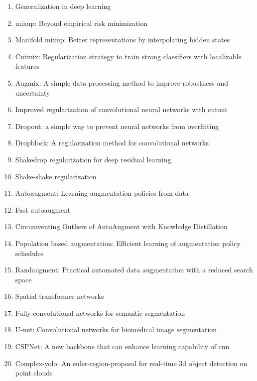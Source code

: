 \documentclass[acmlarge]{acmart}
\begin{document}
\begin{enumerate}
	\item Generalization in deep learning \cite{kawaguchi2017generalization}
	\item mixup: Beyond empirical risk minimization \cite{zhang2017mixup}
	\item Manifold mixup: Better representations by interpolating hidden states \cite{verma2019manifold}
	\item Cutmix: Regularization strategy to train strong classifiers with localizable features \cite{yun2019cutmix}
	\item Augmix: A simple data processing method to improve robustness and uncertainty \cite{hendrycks2019augmix}
	\item Improved regularization of convolutional neural networks with cutout \cite{devries2017improved}
	\item Dropout: a simple way to prevent neural networks from overfitting \cite{srivastava2014dropout}
	\item Dropblock: A regularization method for convolutional networks \cite{ghiasi2018dropblock}
	\item Shakedrop regularization for deep residual learning \cite{yamada2019shakedrop}
	\item Shake-shake regularization \cite{gastaldi2017shake}
	\item Autoaugment: Learning augmentation policies from data \cite{cubuk2018autoaugment}
	\item Fast autoaugment \cite{lim2019fast}
	\item Circumventing Outliers of AutoAugment with Knowledge Distillation \cite{wei2020circumventing}
	\item Population based augmentation: Efficient learning of augmentation policy schedules \cite{ho2019population}
	\item Randaugment: Practical automated data augmentation with a reduced search space \cite{cubuk2020randaugment}
	\item Spatial transformer networks \cite{jaderberg2015spatial}
	\item Fully convolutional networks for semantic segmentation \cite{long2015fully}
	\item U-net: Convolutional networks for biomedical image segmentation \cite{ronneberger2015u}
	\item CSPNet: A new backbone that can enhance learning capability of cnn \cite{wang2020cspnet}
	\item Complex-yolo: An euler-region-proposal for real-time 3d object detection on point clouds \cite{simony2018complex}

\end{enumerate}
\end{document}
